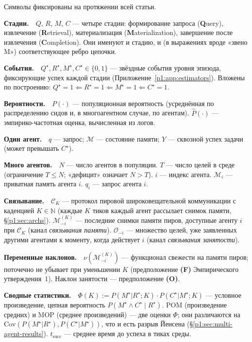 \documentclass{article}
\begin{document}
Символы фиксированы на протяжении всей статьи.

\newcommand{\notentry}[1]{\par\smallskip\noindent\textbf{#1}\ \ }

\notentry{Стадии.}$Q$, $R$, $M$, $C$ --- четыре стадии: формирование запроса (\textbf{Q}uery), извлечение (\textbf{R}etrieval), материализация (\textbf{M}aterialization), завершение после извлечения (\textbf{C}ompletion). Они именуют и стадию, и (в выражениях вроде «звено M») соответствующее ребро цепочки.

\notentry{События.}$Q^\star, R^\star, M^\star, C^\star \in \{0, 1\}$ --- звёздные события уровня эпизода, фиксирующие успех каждой стадии (Приложение~\ref{p1:app:estimators}). Вложены по построению: $Q^\star{=}1 \Leftarrow R^\star{=}1 \Leftarrow M^\star{=}1 \Leftarrow C^\star{=}1$.

\notentry{Вероятности.}$P(\cdot)$ --- популяционная вероятность (усреднённая по распределению сидов и, в многоагентном случае, по агентам). $\hat{P}(\cdot)$ --- эмпирико-частотная оценка, вычисленная из логов.

\notentry{Один агент.}$q$ --- запрос; $\mathcal{M}$ --- состояние памяти; $Y$ --- сквозной успех задачи (может превышать $C^\star$).

\notentry{Много агентов.}$N$ --- число агентов в популяции. $T$ --- число целей в среде (ограничение $T \le N$; «дефицит» означает $N > T$). $i$ --- индекс агента. $\mathcal{M}_i$ --- приватная память агента $i$. $q_i$ --- запрос агента $i$.

\notentry{Связывание.}$\mathcal{C}_K$ --- протокол пировой широковещательной коммуникации с каденцией $K \in \mathbb{N}$ (каждые $K$ тиков каждый агент рассылает снимок памяти, \S\ref{p1:sec:archs}). $\mathcal{M}_{-i}^{(K)}$ --- последние снимки памяти пиров, доступные агенту $i$ при $\mathcal{C}_K$ (канал \emph{связывания памяти}). $\mathcal{O}_{-i}$ --- множество целей, уже заявленных другими агентами к моменту, когда действует $i$ (канал \emph{связывания занятости}).

\notentry{Переменные наклонов.}$\nu(\mathcal{M}_{-i}^{(K)})$ --- функционал свежести на памяти пиров; поточечно не убывает при уменьшении $K$ (предположение \textbf{(F)} Эмпирического утверждения~1). Наклон занятости --- предположение \textbf{(O)}.

\notentry{Сводные статистики.}$\Phi(K) := P(M^\star|R^\star;K)\cdot P(C^\star|M^\star;K)$ --- условное произведение, цепная вероятность $P(M^\star \land C^\star \mid R^\star)$. POM (произведение средних) и MOP (среднее произведений) --- две оценки $\Phi$; они различаются на $\mathrm{Cov}(P(M^\star|R^\star), P(C^\star|M^\star))$, что и есть разрыв Йенсена (\S\ref{p1:sec:multi-agent-results}). $t_{\mathrm{succ}}$ --- среднее время до успеха в тиках среды.
\par\smallskip
\end{document}
